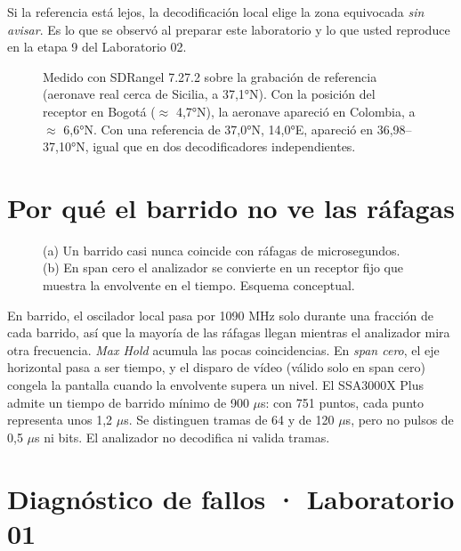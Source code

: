 Si la referencia está lejos, la decodificación local elige la zona equivocada \emph{sin avisar}. Es lo que se observó al preparar este laboratorio y lo que usted reproduce en la etapa 9 del Laboratorio 02.

\begin{figure}[H]
\centering
\resizebox{\linewidth}{!}{}
\caption{Medido con SDRangel 7.27.2 sobre la grabación de referencia (aeronave real cerca de Sicilia, a 37,1°N). Con la posición del receptor en Bogotá ($\approx$ 4,7°N), la aeronave apareció en Colombia, a $\approx$ 6,6°N. Con una referencia de 37,0°N, 14,0°E, apareció en 36,98--37,10°N, igual que en dos decodificadores independientes.}
\label{fig:a-cpr}
\end{figure}

\section{Por qué el barrido no ve las ráfagas}
\label{sec:a-barrido}

\begin{figure}[H]
\centering
\resizebox{\linewidth}{!}{}
\caption{(a) Un barrido casi nunca coincide con ráfagas de microsegundos. (b) En span cero el analizador se convierte en un receptor fijo que muestra la envolvente en el tiempo. Esquema conceptual.}
\label{fig:a-barrido}
\end{figure}

En barrido, el oscilador local pasa por 1090 MHz solo durante una fracción de cada barrido, así que la mayoría de las ráfagas llegan mientras el analizador mira otra frecuencia. \emph{Max Hold} acumula las pocas coincidencias. En \emph{span cero}, el eje horizontal pasa a ser tiempo, y el disparo de vídeo (válido solo en span cero) congela la pantalla cuando la envolvente supera un nivel. El SSA3000X Plus admite un tiempo de barrido mínimo de 900 $\mu$s: con 751 puntos, cada punto representa unos 1,2 $\mu$s. Se distinguen tramas de 64 y de 120 $\mu$s, pero no pulsos de 0,5 $\mu$s ni bits. El analizador no decodifica ni valida tramas.

\section{Diagnóstico de fallos · Laboratorio 01}
\label{sec:a-diagfm}

